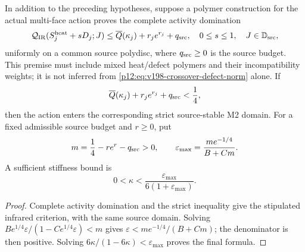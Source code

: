 \documentclass[12pt,a4paper]{article}
\begin{document}
\begin{proposition}
\label{p12:prop:v198-conditional-stopping-budget}
In addition to the preceding hypotheses, suppose a polymer construction for
the actual multi-face action proves the complete activity domination
\begin{equation}
\label{p12:eq:v198-complete-activity-domination}
 \mathcal Q_{\rm IR}(S_j^{\rm heat}+sD_j;J)
 \le\overline Q(\kappa_j)+r_je^{r_j}+q_{\rm src},
 \quad 0\le s\le1,\quad J\in\mathbb D_{\rm src},
\end{equation}
uniformly on a common source polydisc, where $q_{\rm src}\ge0$ is the
source budget.  This premise must include mixed heat/defect polymers and
their incompatibility weights; it is not inferred from
\eqref{p12:eq:v198-crossover-defect-norm} alone.  If
\begin{equation}
\label{p12:eq:v198-stopping-budget}
 \overline Q(\kappa_j)+r_je^{r_j}+q_{\rm src}<\frac14,
\end{equation}
then the action enters the corresponding strict source-stable M2 domain.
For a fixed admissible source budget and $r\ge0$, put
\[
 m=\frac14-re^r-q_{\rm src}>0,\qquad
 \varepsilon_{\max}=\frac{me^{-1/4}}{B+Cm}.
\]
A sufficient stiffness bound is
\begin{equation}
\label{p12:eq:v198-stiffness-threshold}
 0<\kappa<\frac{\varepsilon_{\max}}{6(1+\varepsilon_{\max})}.
\end{equation}
\end{proposition}
\begin{proof}
Complete activity domination and the strict inequality give the stipulated
infrared criterion, with the same source domain.  Solving
$B e^{1/4}\varepsilon/(1-Ce^{1/4}\varepsilon)<m$ gives
$\varepsilon<me^{-1/4}/(B+Cm)$; the denominator is then positive.
Solving $6\kappa/(1-6\kappa)<\varepsilon_{\max}$ proves the final formula.
\end{proof}
\end{document}
